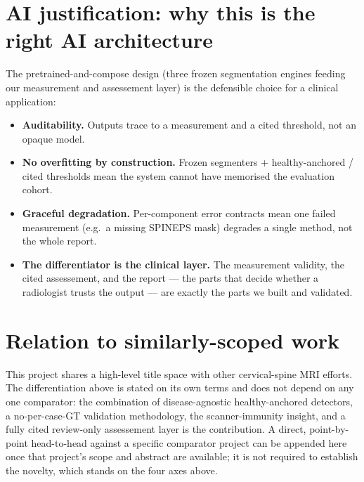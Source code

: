 \documentclass[11pt]{article}
\begin{document}
\section{AI justification: why this is the right AI architecture}
The pretrained-and-compose design (three frozen segmentation engines feeding our measurement and
assessement layer) is the defensible choice for a clinical
application:
\begin{itemize}
  \item \textbf{Auditability.} Outputs trace to a measurement and a cited threshold, not an opaque model.
  \item \textbf{No overfitting by construction.} Frozen segmenters + healthy-anchored / cited thresholds
  mean the system cannot have memorised the evaluation cohort.
  \item \textbf{Graceful degradation.} Per-component error contracts mean one failed measurement (e.g.\ a
  missing SPINEPS mask) degrades a single method, not the whole report.
  \item \textbf{The differentiator is the clinical layer.} The measurement validity, the cited
  assessement, and the report --- the parts that decide whether a radiologist trusts the output ---
  are exactly the parts we built and validated.
\end{itemize}

\section{Relation to similarly-scoped work}
This project shares a high-level title space with other cervical-spine MRI efforts. The differentiation
above is stated on its own terms and does not depend on any one comparator: the combination of
disease-agnostic healthy-anchored detectors, a no-per-case-GT validation methodology, the
scanner-immunity insight, and a fully cited review-only assessement layer is the contribution. A
direct, point-by-point head-to-head against a specific comparator project can be appended here once that
project's scope and abstract are available; it is not required to establish the novelty, which stands on
the four axes above.
\end{document}
